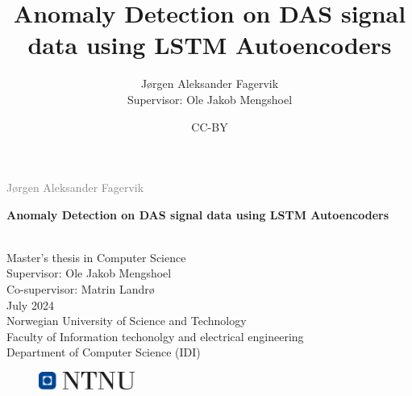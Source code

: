 \documentclass[british]{ntnuthesis}
\title{Anomaly Detection on DAS signal data using LSTM Autoencoders}
\author{Jørgen Aleksander Fagervik \\
        Supervisor: Ole Jakob Mengshoel}
\date{CC-BY \ntnuthesisdate}
\begin{document}
\begin{titlepage}
\vspace*{1.5cm}

\noindent  \textcolor{gray}{\large Jørgen Aleksander Fagervik} \\
\vspace{1cm}

\noindent \textbf{\Large Anomaly Detection on DAS signal data using LSTM Autoencoders} \\
\vspace{0.5cm}

 \\



\vspace{7cm}
\noindent Master's thesis in Computer Science \\
Supervisor: Ole Jakob Mengshoel \\
Co-supervisor: Matrin Landrø \\
July 2024 \\

\vspace{0.2cm}
\noindent Norwegian University of Science and Technology \\
Faculty of Information techonolgy and electrical engineering \\
Department of Computer Science (IDI) \\

\begin{figure}[h]
    \includegraphics[width=0.28\textwidth]{figures/ntnu_basic.png}
\end{figure}
\end{titlepage}
\restoregeometry
\myemptypage 





\tableofcontents
\listoffigures
\listoftables
\lstlistoflistings

\printglossary[type=\acronymtype] %
\printglossary                    %









\chapter*{\bibname}
\printbibliography[heading=none]

%

\appendix






\end{document}
